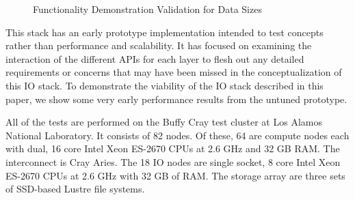 \documentclass[conference]{IEEEtran}
\begin{document}
\begin{figure}[htbp!]
\centering
\vspace{-0.10in}
\vspace{-0.10in}
\caption{Functionality Demonstration Validation for Data Sizes}
\label{fig:eval-size}
\vspace{-0.05in}
\end{figure}

This stack has an early prototype implementation intended to test concepts
rather than performance and scalability. It has focused on examining the
interaction of the different APIs for each layer to flesh out any detailed
requirements or concerns that may have been missed in the conceptualization of
this IO stack. To demonstrate the viability of the IO stack described in this
paper, we show some very early performance results from the untuned prototype.

All of the tests are performed on the Buffy Cray test cluster at Los Alamos
National Laboratory. It consists of 82 nodes. Of these, 64 are compute nodes
each with dual, 16 core Intel Xeon ES-2670 CPUs at 2.6 GHz and 32 GB RAM. The
interconnect is Cray Aries. The 18 IO nodes are single socket, 8 core Intel
Xeon ES-2670 CPUs at 2.6 GHz with 32 GB of RAM.  The storage array are three
sets of SSD-based Lustre file systems.
\end{document}
